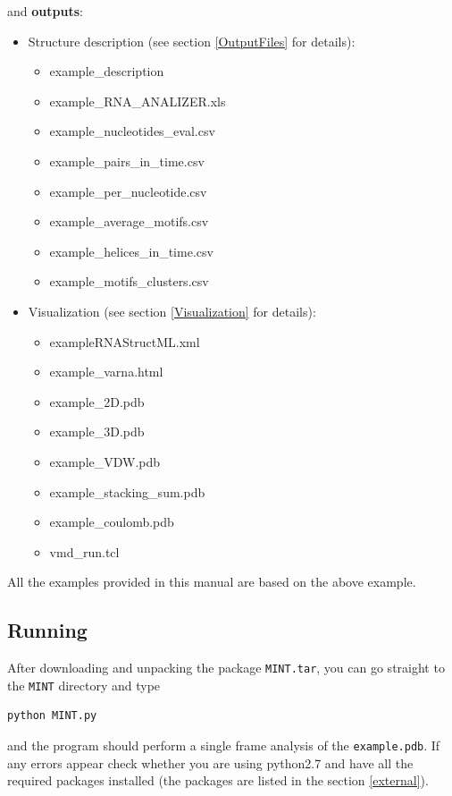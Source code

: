 \documentclass[12pt]{article}
\begin{document}
and \textbf{outputs}:
\begin{itemize}
\item Structure description (see section \ref{OutputFiles} for details):
\begin{itemize}
\item example\_description			
\item example\_RNA\_ANALIZER.xls	
\item example\_nucleotides\_eval.csv
\item example\_pairs\_in\_time.csv
\item example\_per\_nucleotide.csv
\item example\_average\_motifs.csv		
\item example\_helices\_in\_time.csv		
\item example\_motifs\_clusters.csv
\end{itemize}
\item Visualization  (see section \ref{Visualization} for details):
\begin{itemize}
\item exampleRNAStructML.xml		
\item example\_varna.html
\item example\_2D.pdb				
\item example\_3D.pdb				
\item example\_VDW.pdb				
\item example\_stacking\_sum.pdb
\item example\_coulomb.pdb			
\item vmd\_run.tcl
\end{itemize}
\end{itemize}

All the examples provided in this manual are based on the above example.

\subsection{Running}
After downloading and unpacking the package \texttt{MINT.tar}, you can go straight to the \texttt{MINT} directory and type
\begin{verbatim}
python MINT.py
\end{verbatim}

and the program should perform a single frame analysis of the \texttt{example.pdb}. If any errors appear check whether you are using python2.7 and have all the required packages installed (the packages are listed in the section \ref{external}).
\end{document}
